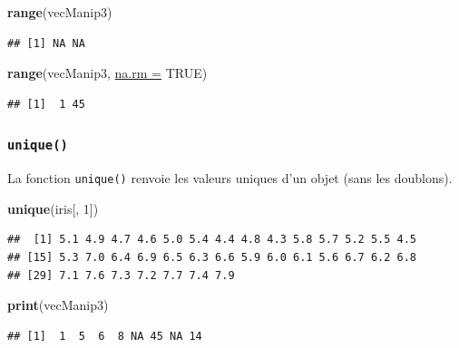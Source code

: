 \documentclass[twoside,symmetric]{book}
\newenvironment{Shaded}{}{}
\newcommand{\DataTypeTok}[1]{\underline{#1}}
\newcommand{\DecValTok}[1]{#1}
\newcommand{\KeywordTok}[1]{\textbf{#1}}
\newcommand{\NormalTok}[1]{#1}
\newcommand{\OtherTok}[1]{#1}
\begin{document}
\begin{Shaded}
\begin{Highlighting}[]
\KeywordTok{range}\NormalTok{(vecManip3)}
\end{Highlighting}
\end{Shaded}

\begin{verbatim}
## [1] NA NA
\end{verbatim}

\begin{Shaded}
\begin{Highlighting}[]
\KeywordTok{range}\NormalTok{(vecManip3, }\DataTypeTok{na.rm =} \OtherTok{TRUE}\NormalTok{)}
\end{Highlighting}
\end{Shaded}

\begin{verbatim}
## [1]  1 45
\end{verbatim}

\hypertarget{l015unique}{%
\subsubsection{\texorpdfstring{\texttt{unique()}}{unique()}}\label{l015unique}}

La fonction \texttt{unique()} renvoie les valeurs uniques d'un objet (sans les doublons).

\begin{Shaded}
\begin{Highlighting}[]
\KeywordTok{unique}\NormalTok{(iris[, }\DecValTok{1}\NormalTok{])}
\end{Highlighting}
\end{Shaded}

\begin{verbatim}
##  [1] 5.1 4.9 4.7 4.6 5.0 5.4 4.4 4.8 4.3 5.8 5.7 5.2 5.5 4.5
## [15] 5.3 7.0 6.4 6.9 6.5 6.3 6.6 5.9 6.0 6.1 5.6 6.7 6.2 6.8
## [29] 7.1 7.6 7.3 7.2 7.7 7.4 7.9
\end{verbatim}

\begin{Shaded}
\begin{Highlighting}[]
\KeywordTok{print}\NormalTok{(vecManip3)}
\end{Highlighting}
\end{Shaded}

\begin{verbatim}
## [1]  1  5  6  8 NA 45 NA 14
\end{verbatim}
\end{document}
